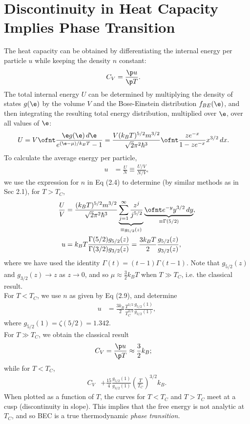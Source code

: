 \documentclass[a4paper, 11pt, normalem]{report}
\begin{document}
\section{Discontinuity in Heat Capacity Implies Phase Transition}
The heat capacity can be obtained by differentiating the internal energy per particle $u$ while keeping the density $n$ constant:
\begin{align}
    C_V &= \frac{\p u}{\p T}.
\end{align}
The total internal energy $U$ can be determined by multiplying the density of states $g(\e)$ by the volume $V$ and the Bose-Einstein distribution $f_{BE}(\e)$, and then integrating the resulting total energy distribution, multiplied over $\e$, over all values of $\e$:
\begin{align}
    U &= V\ofnt \frac{\e g(\e)\,d\e}{e^{(\e-\mu)/k_BT}-1} = \frac{V(k_BT)^{5/2}m^{3/2}}{\sqrt{2}\pi^2\hbar^3}\ofnt \frac{ze^{-x}}{1-ze^{-x}}x^{3/2}\,dx.
\end{align}
To calculate the average energy per particle,
\begin{align}
    u &= \frac{U}{N} \equiv \frac{U/V}{N/V},
\end{align}
we use the expression for $n$ in Eq (2.4) to determine (by similar methods as in Sec 2.1), for $T>T_C$,
\begin{align}
    \frac{U}{V} &= \frac{(k_BT)^{5/2}m^{3/2}}{\sqrt{2}\pi^2\hbar^3}\underbrace{\sum_{j=1}^\infty\frac{z^j}{j^{5/2}}}_{\equiv g_{5/2}(z)}\underbrace{\ofnt e^{-y}y^{3/2}\,dy}_{\equiv \Gamma(5/2)},\\
    u &= k_BT\frac{\Gamma(5/2)g_{5/2}(z)}{\Gamma(3/2)g_{3/2}(z)} = \frac{3k_BT}{2}\frac{g_{5/2}(z)}{g_{3/2}(z)},
\end{align}
where we have used the identity $\Gamma(t)=(t-1)\Gamma(t-1)$.
Note that $g_{5/2}(z)$ and $g_{3/2}(z) \to z$ as $z\to0$, and so $\mu\approx \frac32 k_BT$ when $T\gg T_C$, i.e. the classical result. \\
For $T<T_C$, we use $n$ as given by Eq (2.9), and determine
\begin{align}
    u &= \frac{3k_B}{2}\frac{T^{5/2}}{T^{3/2}_C}\frac{g_{5/2}(1)}{g_{3/2}(1)},
\end{align}
where $g_{5/2}(1)=\zeta(5/2)=1.342$.\\
For $T\gg T_C$, we obtain the classical result
\begin{align}
    C_V &= \frac{\p u}{\p T} \approx \frac32 k_B;
\end{align}
while for $T<T_C$,
\begin{align}
    C_V &+ \frac{15}{4}\frac{g_{5/2}(1)}{g_{3/2}(1)}\left(\frac{T}{T_C}\right)^{3/2}k_B.
\end{align}
When plotted as a function of $T$, the curves for $T<T_C$ and $T>T_C$ meet at a cusp (discontinuity in slope).
This implies that the free energy is not analytic at $T_C$, and so BEC is a true thermodynamic \emph{phase transition.}
\end{document}
